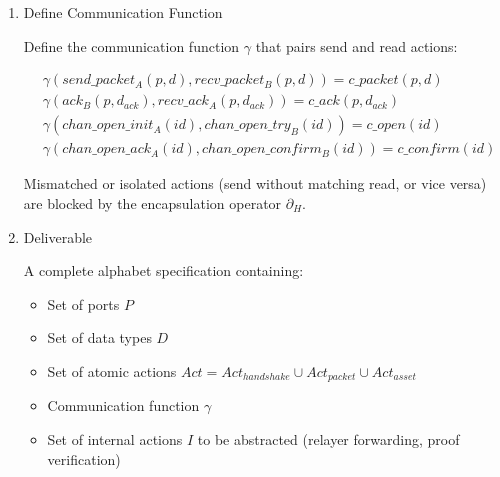 \begin{enumerate}
  \textbf{Handshake actions (ICS-004):} \[
  \begin{aligned}
  & chan\_open\_init_{A}(id) \\
  & chan\_open\_try_{B}(id) \\
  & chan\_open\_ack_{A}(id) \\
  & chan\_open\_confirm_{B}(id)
  \end{aligned}
  \]

  \textbf{Packet actions (ICS-004):} \[
  \begin{aligned}
  & send\_packet_{A}(p,d) \\
  & recv\_packet_{B}(p,d) \\
  & ack_{B}(p,d_{ack}) \\
  & recv\_ack_{A}(p,d_{ack}) \\
  & timeout_{A}(p)
  \end{aligned}
  \]

  \textbf{Asset-specific actions (ICS-020):} \[
  \begin{aligned}
  & lock_{A}(asset) \\
  & burn_{A}(asset) \quad \text{(alternative to lock)} \\
  & mint_{B}(voucher) \\
  & verify\_proof_{B}(proof)
  \end{aligned}
  \]
\item
  Define Communication Function

  Define the communication function \(\gamma\) that pairs send and read
  actions:

  \[
  \begin{aligned}
  & \gamma(send\_packet_{A}(p,d), recv\_packet_{B}(p,d)) = c\_packet(p,d) \\
  & \gamma(ack_{B}(p,d_{ack}), recv\_ack_{A}(p,d_{ack})) = c\_ack(p,d_{ack}) \\
  & \gamma(chan\_open\_init_{A}(id), chan\_open\_try_{B}(id)) = c\_open(id) \\
  & \gamma(chan\_open\_ack_{A}(id), chan\_open\_confirm_{B}(id)) = c\_confirm(id)
  \end{aligned}
  \]

  Mismatched or isolated actions (send without matching read, or vice
  versa) are blocked by the encapsulation operator \(\partial_H\).
\item
  Deliverable

  A complete alphabet specification containing:

  \begin{itemize}
      \item Set of ports \(P\)
      \item Set of data types \(D\)
      \item Set of atomic actions \(Act = Act_{handshake} \cup Act_{packet} \cup Act_{asset}\)
      \item Communication function \(\gamma\)
      \item Set of internal actions \(I\) to be abstracted (relayer forwarding, proof verification)
  \end{itemize}
\end{enumerate}

